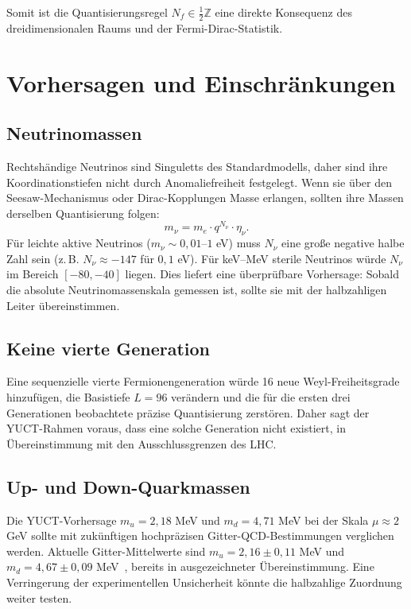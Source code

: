 \documentclass[12pt,a4paper]{article}
\begin{document}
	Somit ist die Quantisierungsregel \(N_f \in \frac{1}{2}\mathbb{Z}\) eine direkte Konsequenz des dreidimensionalen Raums und der Fermi-Dirac-Statistik.
	
	\section{Vorhersagen und Einschränkungen}
	
	\subsection{Neutrinomassen}
	
	Rechtshändige Neutrinos sind Singuletts des Standardmodells, daher sind ihre Koordinationstiefen nicht durch Anomaliefreiheit festgelegt. Wenn sie über den Seesaw-Mechanismus oder Dirac-Kopplungen Masse erlangen, sollten ihre Massen derselben Quantisierung folgen:
	\begin{equation}
		m_\nu = m_e \cdot q^{N_\nu} \cdot \eta_\nu.
	\end{equation}
	Für leichte aktive Neutrinos (\(m_\nu \sim 0,01\)–\(1\) eV) muss \(N_\nu\) eine große negative halbe Zahl sein (z. B. \(N_\nu \approx -147\) für \(0,1\) eV). Für keV–MeV sterile Neutrinos würde \(N_\nu\) im Bereich \([-80, -40]\) liegen. Dies liefert eine überprüfbare Vorhersage: Sobald die absolute Neutrinomassenskala gemessen ist, sollte sie mit der halbzahligen Leiter übereinstimmen.
	
	\subsection{Keine vierte Generation}
	
	Eine sequenzielle vierte Fermionengeneration würde 16 neue Weyl-Freiheitsgrade hinzufügen, die Basistiefe \(L=96\) verändern und die für die ersten drei Generationen beobachtete präzise Quantisierung zerstören. Daher sagt der YUCT-Rahmen voraus, dass eine solche Generation nicht existiert, in Übereinstimmung mit den Ausschlussgrenzen des LHC.
	
	\subsection{Up- und Down-Quarkmassen}
	
	Die YUCT-Vorhersage \(m_u = 2,18\) MeV und \(m_d = 4,71\) MeV bei der Skala \(\mu \approx 2\) GeV sollte mit zukünftigen hochpräzisen Gitter-QCD-Bestimmungen verglichen werden. Aktuelle Gitter-Mittelwerte sind \(m_u = 2,16 \pm 0,11\) MeV und \(m_d = 4,67 \pm 0,09\) MeV~\cite{PDG2024}, bereits in ausgezeichneter Übereinstimmung. Eine Verringerung der experimentellen Unsicherheit könnte die halbzahlige Zuordnung weiter testen.
	
\end{document}
